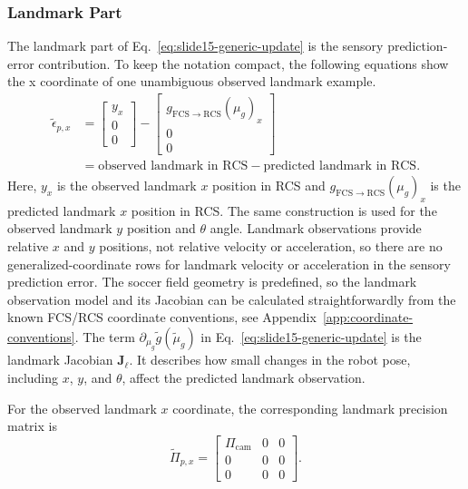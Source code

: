 \subsubsection{Landmark Part}
\label{subsec:gradient-landmarks}

The landmark part of Eq.~\ref{eq:slide15-generic-update} is the sensory prediction-error contribution.
To keep the notation compact, the following equations show the x coordinate of one unambiguous observed landmark example.
\begin{align}
    \tilde{\epsilon}_{p,x}
    &=
    \begin{bmatrix}
        y_x \\
        0 \\
        0
    \end{bmatrix}
    -
    \begin{bmatrix}
        g_{\mathrm{FCS}\rightarrow\mathrm{RCS}}(\mu_g)_x \\
        0 \\
        0
    \end{bmatrix}
    \nonumber \\
    &=
    \text{observed landmark in RCS}
    -
    \text{predicted landmark in RCS}.
    \label{eq:landmark-error-x}
\end{align}
Here, $y_x$ is the observed landmark $x$ position in RCS and $g_{\mathrm{FCS}\rightarrow\mathrm{RCS}}(\mu_g)_x$ is the predicted landmark $x$ position in RCS. The same construction is used for the observed landmark $y$ position and $\theta$ angle.
Landmark observations provide relative $x$ and $y$ positions, not relative velocity or acceleration, so there are no generalized-coordinate rows for landmark velocity or acceleration in the sensory prediction error.
The soccer field geometry is predefined, so the landmark observation model and its Jacobian can be calculated straightforwardly from the known FCS/RCS coordinate conventions, see Appendix~\ref{app:coordinate-conventions}.
The term $\partial_{\mu_g}\tilde{g}(\tilde{\mu}_g)$ in Eq.~\ref{eq:slide15-generic-update} is the landmark Jacobian $\boldsymbol{J}_{\ell}$. It describes how small changes in the robot pose, including $x$, $y$, and $\theta$, affect the predicted landmark observation.

For the observed landmark $x$ coordinate, the corresponding landmark precision matrix is
\begin{equation}
    \tilde{\Pi}_{p,x}
    =
    \begin{bmatrix}
        \Pi_{\mathrm{cam}} & 0 & 0 \\
        0 & 0 & 0 \\
        0 & 0 & 0
    \end{bmatrix}.
    \label{eq:landmark-precision-x}
\end{equation}

